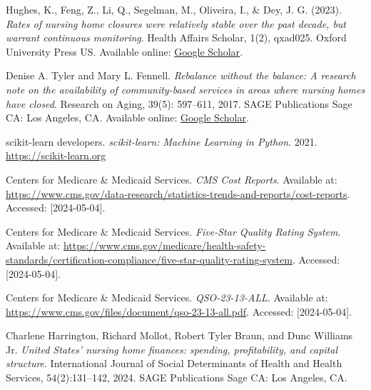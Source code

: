 \documentclass{article}
\theoremstyle{mytheoremstyle}
\theoremstyle{mytheoremstyle}
\theoremstyle{myproblemstyle}
\begin{document}
\begin{thebibliography}{9}

Hughes, K., Feng, Z., Li, Q., Segelman, M., Oliveira, I., \& Dey, J. G. (2023).
\textit{Rates of nursing home closures were relatively stable over the past decade, but warrant continuous monitoring}.
Health Affairs Scholar, 1(2), qxad025. Oxford University Press US. Available online: \href{https://scholar.google.com/scholar_lookup?journal=Heal+Aff+Sch&title=Rates+of+nursing+home+closures+were+relatively+stable+over+the+past+decade,+but+warrant+continuous+monitoring&author=K+Hughes&author=Z+Feng&author=Q+Li&volume=1&issue=2&publication_year=2023&d=gs_cit&t=1714807740518&u=%2Fscholar%3Fq%3Dinfo%3AT6cB2hNX4sgJ%3Ascholar.google.com%2F%26output%3Dcite%26scirp%3D0%26hl%3Den}{Google Scholar}.

Denise A. Tyler and Mary L. Fennell.
\textit{Rebalance without the balance: A research note on the availability of community-based services in areas where nursing homes have closed}.
Research on Aging, 39(5): 597--611, 2017.
SAGE Publications Sage CA: Los Angeles, CA. Available online: \href{https://scholar.google.com/scholar_lookup?journal=Heal+Aff+Sch&title=Rates+of+nursing+home+closures+were+relatively+stable+over+the+past+decade,+but+warrant+continuous+monitoring&author=K+Hughes&author=Z+Feng&author=Q+Li&volume=1&issue=2&publication_year=2023&}{Google Scholar}.

scikit-learn developers. 
\textit{scikit-learn: Machine Learning in Python}. 
2021. 
\url{https://scikit-learn.org}

Centers for Medicare \& Medicaid Services.
\textit{CMS Cost Reports}. 
Available at: \url{https://www.cms.gov/data-research/statistics-trends-and-reports/cost-reports}.
Accessed: [2024-05-04].

Centers for Medicare \& Medicaid Services.
\textit{Five-Star Quality Rating System}. 
Available at: \url{https://www.cms.gov/medicare/health-safety-standards/certification-compliance/five-star-quality-rating-system}.
Accessed: [2024-05-04].

Centers for Medicare \& Medicaid Services.
\textit{QSO-23-13-ALL}. 
Available at: \url{https://www.cms.gov/files/document/qso-23-13-all.pdf}.
Accessed: [2024-05-04].

Charlene Harrington, Richard Mollot, Robert Tyler Braun, and Dunc Williams Jr.
\textit{United States' nursing home finances: spending, profitability, and capital structure}.
International Journal of Social Determinants of Health and Health Services, 54(2):131--142, 2024.
SAGE Publications Sage CA: Los Angeles, CA.

\end{thebibliography}


\end{document}
